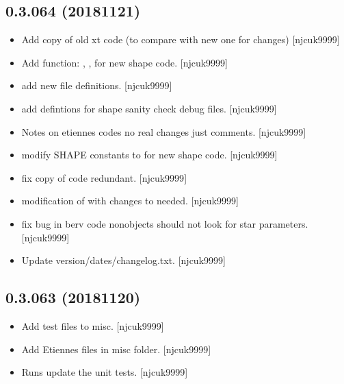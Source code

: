 \documentclass[a4paper,10pt,english]{report}
\begin{document}
\subsection{0.3.064 (2018\sphinxhyphen{}11\sphinxhyphen{}21)}
\label{\detokenize{misc/changelog:id278}}\begin{itemize}
\item {} 
Add copy of old xt code (to compare with new one for changes)
{[}njcuk9999{]}

\item {} 
Add function: , ,  for
new shape code. {[}njcuk9999{]}

\item {} 
 \sphinxhyphen{} add new file definitions. {[}njcuk9999{]}

\item {} 
 \sphinxhyphen{} add defintions for shape sanity check debug files.
{[}njcuk9999{]}

\item {} 
Notes on etiennes codes \sphinxhyphen{} no real changes just comments. {[}njcuk9999{]}

\item {} 
 \sphinxhyphen{} modify SHAPE constants to for new shape
code. {[}njcuk9999{]}

\item {} 
 \sphinxhyphen{} fix copy of code \sphinxhyphen{} redundant. {[}njcuk9999{]}

\item {} 
 \sphinxhyphen{} modification of  with
changes to  needed. {[}njcuk9999{]}

\item {} 
 \sphinxhyphen{} fix bug in berv code \sphinxhyphen{} non\sphinxhyphen{}objects should not look for
star parameters. {[}njcuk9999{]}

\item {} 
Update version/dates/changelog.txt. {[}njcuk9999{]}

\end{itemize}


\subsection{0.3.063 (2018\sphinxhyphen{}11\sphinxhyphen{}20)}
\label{\detokenize{misc/changelog:id279}}\begin{itemize}
\item {} 
Add test files to misc. {[}njcuk9999{]}

\item {} 
Add Etiennes files in misc folder. {[}njcuk9999{]}

\item {} 
Runs \sphinxhyphen{} update the unit tests. {[}njcuk9999{]}

\end{itemize}
\end{document}
